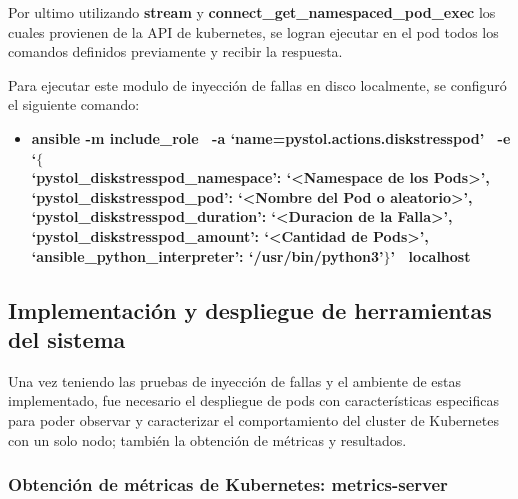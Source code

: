 \par Por ultimo utilizando \textbf{stream} y \textbf{connect\_get\_namespaced\_pod\_exec} los cuales provienen de la API de kubernetes, se logran ejecutar en el pod todos los comandos definidos previamente y recibir la respuesta.\\

\par Para ejecutar este modulo de inyección de fallas en disco localmente, se configur\'o el siguiente comando:
\begin{itemize}
    \item \textbf{ansible -m include\_role \ -a `name=pystol.actions.diskstresspod' \ -e `$\{$ \\
    `pystol\_diskstresspod\_namespace': `<Namespace de los Pods>', \\
    `pystol\_diskstresspod\_pod': `<Nombre del Pod o aleatorio>', \\
    `pystol\_diskstresspod\_duration': `<Duracion de la Falla>', \\
    `pystol\_diskstresspod\_amount': `<Cantidad de Pods>', \\
    `ansible\_python\_interpreter': `/usr/bin/python3'$\}$' \ localhost} %
\end{itemize}

\subsection{Implementación y despliegue de herramientas del sistema}
\par Una vez teniendo las pruebas de inyección de fallas y el ambiente de estas implementado, fue necesario el despliegue de pods con características especificas para poder observar y caracterizar el comportamiento del cluster de Kubernetes con un solo nodo; también la obtención de métricas y resultados.\\
\subsubsection{Obtenci\'on de m\'etricas de Kubernetes: metrics-server}

